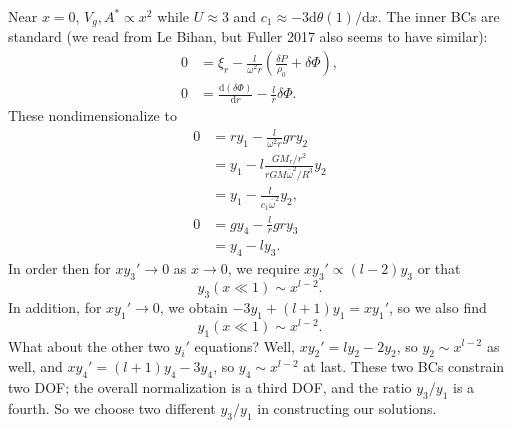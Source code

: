 \documentclass[11pt,
        usenames, %
        twocolumn,
        landscape,
        dvipsnames %
    ]{article}
\newcommand*{\rd}[2]{\frac{\mathrm{d}#1}{\mathrm{d}#2}}
\newcommand*{\rdil}[2]{\mathrm{d}#1 / \mathrm{d}#2}
\newcommand*{\p}[1]{\left(#1\right)}
\begin{document}
Near $x = 0$, $V_g, A^* \propto x^2$ while $U \approx 3$ and $c_1 \approx
-3\rdil{\theta(1)}{x}$. The inner BCs are standard (we read from Le Bihan, but
Fuller 2017 also seems to have similar):
\begin{align}
    0 &= \xi_r - \frac{l}{\omega^2 r}\p{\frac{\delta P}{\rho_0} + \delta \Phi}
        ,\\
    0 &= \rd{(\delta \Phi)}{r} - \frac{l}{r}\delta \Phi.
\end{align}
These nondimensionalize to
\begin{align}
    0 &= ry_1 - \frac{l}{\omega^2r}gry_2\nonumber\\
        &= y_1 - l\frac{GM_r / r^2}{rGM\bar{\omega}^2 / R^3}y_2\nonumber\\
        &= y_1 - \frac{l}{c_1\bar{\omega}^2}y_2,\\
    0 &= gy_4 - \frac{l}{r}gry_3\nonumber\\
        &= y_4 - ly_3.
\end{align}
In order then for $xy_3' \to 0$ as $x \to 0$, we require $xy_3' \propto
(l-2)y_3$ or that
\begin{equation}
    y_3(x \ll 1) \sim x^{l - 2}.
\end{equation}
In addition, for $xy_1' \to 0$, we obtain $-3 y_1 + (l + 1)y_1 = xy_1'$, so we
also find
\begin{equation}
    y_1(x \ll 1) \sim x^{l - 2}.
\end{equation}
What about the other two $y_i'$ equations? Well, $xy_2' = ly_2 - 2y_2$, so $y_2
\sim x^{l - 2}$ as well, and $xy_4' = (l+1)y_4 - 3y_4$, so $y_4 \sim x^{l - 2}$
at last. These two BCs constrain two DOF\@; the overall normalization is a third
DOF, and the ratio $y_3 / y_1$ is a fourth. So we choose two different $y_3 /
y_1$ in constructing our solutions.
\end{document}
